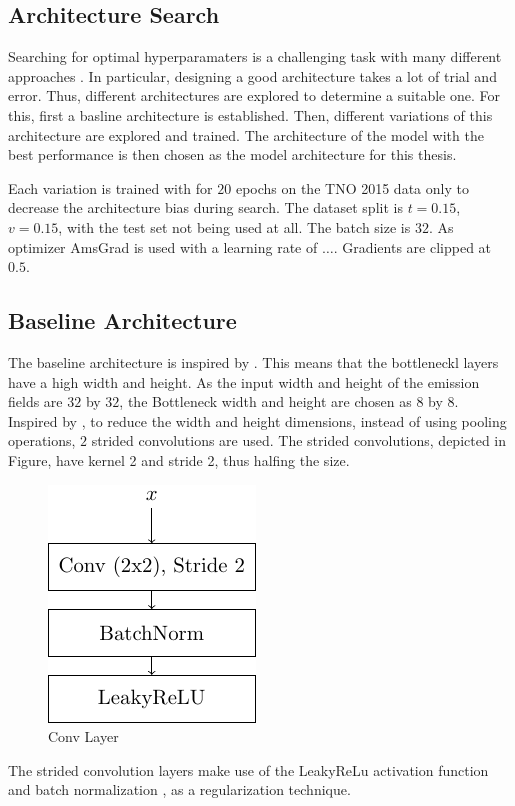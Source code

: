 \subsection{Architecture Search}
Searching for optimal hyperparamaters is a challenging task with many different approaches \parencite{HyperParameters}.
In particular, designing a good architecture takes a lot of trial and error.
Thus, different architectures are explored to determine a suitable one.
For this, first a basline architecture is established.
Then, different variations of this architecture are explored and trained.
The architecture of the model with the best performance is then chosen as the model architecture for this thesis.

Each variation is trained with for $20$ epochs on the TNO 2015 data only to decrease the architecture bias during search.
The dataset split is $t=0.15$, $v=0.15$, with the test set not being used at all.
The batch size is $32$.
As optimizer AmsGrad \parencite{AmsGrad} is used with a learning rate of $\dots$.
Gradients are clipped at $0.5$.

\subsection{Baseline Architecture}
The baseline architecture is inspired by \parencite{Tightrope}.
This means that the bottleneckl layers have a high width and height.
As the input width and height of the emission fields are $32$ by $32$, the Bottleneck width and height are chosen as $8$ by $8$.
Inspired by \parencite{AllConvolutional} , to reduce the width and height dimensions, instead of using pooling operations, $2$ strided convolutions are used.
The strided convolutions, depicted in Figure, have kernel 2 and stride 2, thus halfing the size.
\begin{figure}[h!]
    \centering
    \includegraphics[]{figures/model_architecture/build/conv_layer.pdf}
    \caption{Conv Layer}
\end{figure}
The strided convolution layers make use of the LeakyReLu activation function and batch normalization \parencite{BatchNorm}, as a regularization technique.


